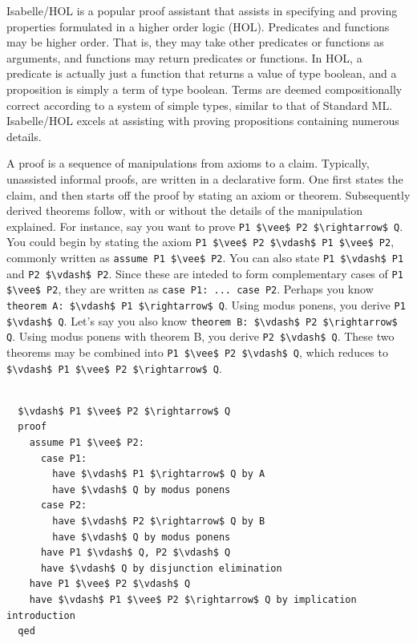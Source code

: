 \documentclass[letterpaper, 11pt]{extarticle}
\begin{document}
Isabelle/HOL is a popular proof assistant that assists in specifying and proving properties
formulated in a higher order logic (HOL). Predicates and functions may be higher order. That is, they
may take other predicates or functions as arguments, and functions may return predicates or functions. 
In HOL, a predicate is actually just a function that returns a value of type boolean, and a proposition
is simply a term of type boolean. Terms are deemed compositionally correct according to a system of simple types, similar to
that of Standard ML. Isabelle/HOL excels at assisting with proving propositions containing numerous details. 

A proof is a sequence of manipulations from axioms to a claim. 
Typically, unassisted informal proofs, are written in a declarative form. One first states the claim,
and then starts off the proof by stating an axiom or theorem. Subsequently derived theorems follow, with
or without the details of the manipulation explained.
For instance, say you want to prove \lstinline[mathescape]{P1 $\vee$ P2 $\rightarrow$ Q}. You could begin by 
stating the axiom \lstinline[mathescape]{P1 $\vee$ P2 $\vdash$ P1 $\vee$ P2}, commonly written as \lstinline[language=logic]{assume P1 $\vee$ P2}.
You can also state \lstinline[mathescape]{P1 $\vdash$ P1} and \lstinline[mathescape]{P2 $\vdash$ P2}. Since
these are inteded to form complementary cases of \lstinline[mathescape]{P1 $\vee$ P2}, they are written as \lstinline[language=logic]{case P1: ... case P2}.
Perhaps you know \lstinline[language=logic]{theorem A: $\vdash$ P1 $\rightarrow$ Q}. Using modus ponens, you derive \lstinline[mathescape]{P1 $\vdash$ Q}. Let's say
you also know \lstinline[language=logic]{theorem B: $\vdash$ P2 $\rightarrow$ Q}. Using modus ponens with theorem B, you derive \lstinline[mathescape]{P2 $\vdash$ Q}.
These two theorems may be combined into \lstinline[mathescape]{P1 $\vee$ P2 $\vdash$ Q}, which reduces to \lstinline[mathescape]{$\vdash$ P1 $\vee$ P2 $\rightarrow$ Q}.


\begin{lstlisting}[language=logic, mathescape]
  
  $\vdash$ P1 $\vee$ P2 $\rightarrow$ Q
  proof
    assume P1 $\vee$ P2:
      case P1:
        have $\vdash$ P1 $\rightarrow$ Q by A
        have $\vdash$ Q by modus ponens
      case P2:
        have $\vdash$ P2 $\rightarrow$ Q by B    
        have $\vdash$ Q by modus ponens
      have P1 $\vdash$ Q, P2 $\vdash$ Q
      have $\vdash$ Q by disjunction elimination
    have P1 $\vee$ P2 $\vdash$ Q
    have $\vdash$ P1 $\vee$ P2 $\rightarrow$ Q by implication introduction  
  qed
  
\end{lstlisting}
\end{document}

